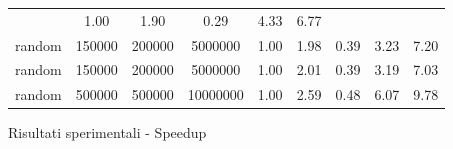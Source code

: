 \begin{figure*}[t]
{\begin{tabular}{lS[table-format=7.0] S[table-format=7.0] S[table-format=8.0] S[table-format=4.2] S[table-format=4.2] S[table-format=4.2] S[table-format=4.2] S[table-format=4.2]}
        & 1.00	
        & 1.90	
        & 0.29	
        & 4.33	
        & 6.77 \\
    random
        & 150000	
        & 200000	
        & 5000000	
        & 1.00	
        & 1.98	
        & 0.39	
        & 3.23	
        & 7.20 \\
    random
        & 150000	
        & 200000	
        & 5000000	
        & 1.00	
        & 2.01	
        & 0.39	
        & 3.19	
        & 7.03 \\
    random
        & 500000	
        & 500000	
        & 10000000	
        & 1.00	
        & 2.59	
        & 0.48	
        & 6.07	
        & 9.78 \\ \bottomrule
    \end{tabular}}
    \caption{Risultati sperimentali -  Speedup}
    \label{results_speedup}
\end{figure*}



